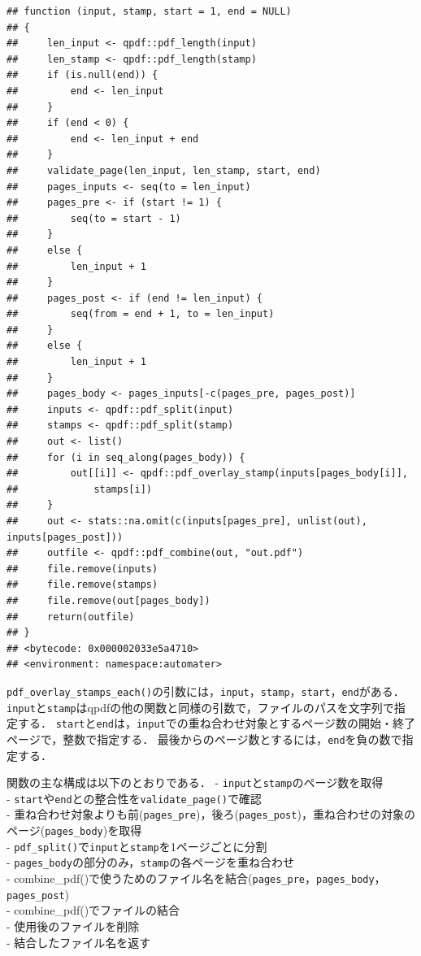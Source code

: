 \documentclass[
]{article}
\begin{document}
\begin{verbatim}
## function (input, stamp, start = 1, end = NULL) 
## {
##     len_input <- qpdf::pdf_length(input)
##     len_stamp <- qpdf::pdf_length(stamp)
##     if (is.null(end)) {
##         end <- len_input
##     }
##     if (end < 0) {
##         end <- len_input + end
##     }
##     validate_page(len_input, len_stamp, start, end)
##     pages_inputs <- seq(to = len_input)
##     pages_pre <- if (start != 1) {
##         seq(to = start - 1)
##     }
##     else {
##         len_input + 1
##     }
##     pages_post <- if (end != len_input) {
##         seq(from = end + 1, to = len_input)
##     }
##     else {
##         len_input + 1
##     }
##     pages_body <- pages_inputs[-c(pages_pre, pages_post)]
##     inputs <- qpdf::pdf_split(input)
##     stamps <- qpdf::pdf_split(stamp)
##     out <- list()
##     for (i in seq_along(pages_body)) {
##         out[[i]] <- qpdf::pdf_overlay_stamp(inputs[pages_body[i]], 
##             stamps[i])
##     }
##     out <- stats::na.omit(c(inputs[pages_pre], unlist(out), inputs[pages_post]))
##     outfile <- qpdf::pdf_combine(out, "out.pdf")
##     file.remove(inputs)
##     file.remove(stamps)
##     file.remove(out[pages_body])
##     return(outfile)
## }
## <bytecode: 0x000002033e5a4710>
## <environment: namespace:automater>
\end{verbatim}

\texttt{pdf\_overlay\_stamps\_each()}の引数には，\texttt{input}，\texttt{stamp}，\texttt{start}，\texttt{end}がある．
\texttt{input}と\texttt{stamp}はqpdfの他の関数と同様の引数で，ファイルのパスを文字列で指定する．
\texttt{start}と\texttt{end}は，\texttt{input}での重ね合わせ対象とするページ数の開始・終了ページで，整数で指定する．
最後からのページ数とするには，\texttt{end}を負の数で指定する．

関数の主な構成は以下のとおりである．
- \texttt{input}と\texttt{stamp}のページ数を取得\\
- \texttt{start}や\texttt{end}との整合性を\texttt{validate\_page()}で確認\\
- 重ね合わせ対象よりも前(\texttt{pages\_pre})，後ろ(\texttt{pages\_post})，重ね合わせの対象のページ(\texttt{pages\_body})を取得\\
- \texttt{pdf\_split()}で\texttt{input}と\texttt{stamp}を1ページごとに分割\\
- \texttt{pages\_body}の部分のみ，\texttt{stamp}の各ページを重ね合わせ\\
- combine\_pdf()で使うためのファイル名を結合(\texttt{pages\_pre}，\texttt{pages\_body}，\texttt{pages\_post})\\
- combine\_pdf()でファイルの結合\\
- 使用後のファイルを削除\\
- 結合したファイル名を返す
\end{document}
